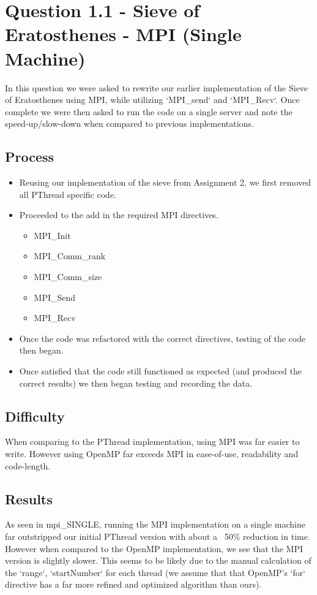 \section*{Question 1.1 - Sieve of Eratosthenes - MPI (Single Machine)}

In this question we were asked to rewrite our earlier implementation of the 
Sieve of Eratosthenes using MPI, while utilizing `MPI\_send` and `MPI\_Recv`. 
Once complete we were then asked to run the code on a single server and note the 
speed-up/slow-down when compared to previous implementations.

\subsection*{Process}

\begin{itemize}
\item Reusing our implementation of the sieve from Assignment 2, we first 
removed all PThread specific code.
\item Proceeded to the add in the required MPI directives.
  \begin{itemize}
    \item MPI\_Init
    \item MPI\_Comm\_rank
    \item MPI\_Comm\_size
    \item MPI\_Send
    \item MPI\_Recv
  \end{itemize}
\item Once the code was refactored with the correct directives, testing of the 
code then began.
\item Once satisfied that the code still functioned as expected (and produced 
the correct results) we then began testing and recording the data.
\end{itemize}

\subsection*{Difficulty}

When comparing to the PThread implementation, using MPI was far easier to write. 
However using OpenMP far exceeds MPI in ease-of-use, readability and code-length.

\subsection*{Results}
As seen in {mpi\_SINGLE}, running the MPI implementation on a single machine far 
outstripped our initial PThread version with about a ~50\% reduction in time.
However when compared to the OpenMP implementation, we see that the MPI version 
is slightly slower. This seems to be likely due to the manual calculation of the 
`range`, `startNumber` for each thread (we assume that that OpenMP's `for` 
directive has a far more refined and optimized algorithm than ours).
